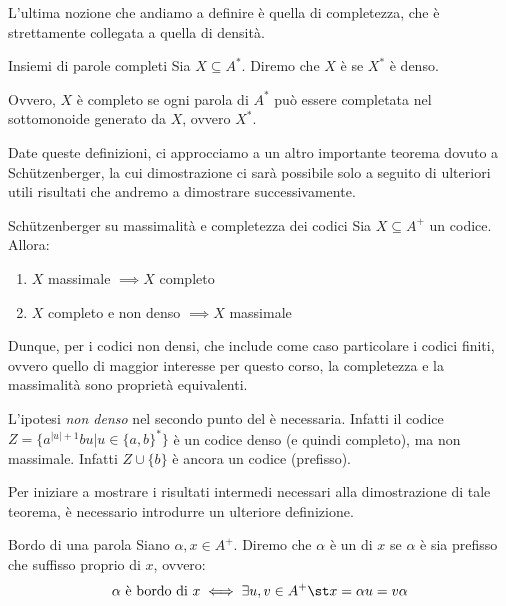 L'ultima nozione che andiamo a definire è quella di completezza, che è strettamente collegata a quella di densità.
\begin{definition}{Insiemi di parole completi}
  Sia \(X \subseteq A^*\). Diremo che \(X\) è  se \(X^*\) è denso.

  Ovvero, \(X\) è completo se ogni parola di \(A^*\) può essere completata nel sottomonoide generato da \(X\), ovvero \(X^*\).
\end{definition}

Date queste definizioni, ci approcciamo a un altro importante teorema dovuto a Schützenberger, la cui dimostrazione ci sarà possibile solo a seguito di ulteriori utili risultati che andremo a dimostrare successivamente.

\begin{theorem}[label=thm:schutz_maximality_completeness]{Schützenberger su massimalità e completezza dei codici}
  Sia \(X \subseteq A^+\) un codice.
  Allora:
  \begin{enumerate}
    \item \(X\) massimale \(\implies X\) completo
    \item \(X\) completo e non denso \(\implies X\) massimale
  \end{enumerate}
\end{theorem}

Dunque, per i codici non densi, che include come caso particolare i codici finiti, ovvero quello di maggior interesse per questo corso, la completezza e la massimalità sono proprietà equivalenti.

\begin{observation}{}
  L'ipotesi \emph{non denso} nel secondo punto del  è necessaria. Infatti il codice \(Z = \{a^{|u|+1}bu | u \in {\{a,b\}}^*\}\) è un codice denso (e quindi completo), ma non massimale.
  Infatti \(Z\cup\{b\}\) è ancora un codice (prefisso).
\end{observation}

Per iniziare a mostrare i risultati intermedi necessari alla dimostrazione di tale teorema, è necessario introdurre un ulteriore definizione.
\begin{definition}{Bordo di una parola}
  Siano \(\alpha,x \in A^+\). Diremo che \(\alpha\) è un  di \(x\) se \(\alpha\) è sia prefisso che suffisso proprio di \(x\), ovvero:
  \[\alpha \text{ è bordo di } x \iff \exists u,v \in A^+ \st x = \alpha u = v \alpha\]
\end{definition}

